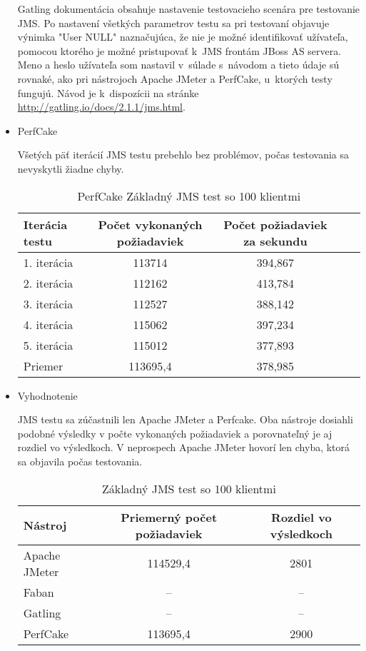 \documentclass[12pt,oneside,final]{fithesis-utf8}
\begin{document}
\begin{itemize}
Gatling dokumentácia obsahuje nastavenie testovacieho scenára pre testovanie JMS. Po nastavení všetkých parametrov testu sa pri testovaní objavuje výnimka "{}User NULL"{} naznačujúca, že nie je možné identifikovať užívateľa, pomocou ktorého je možné pristupovať k~JMS frontám JBoss AS servera. Meno a heslo užívateľa som nastavil v~súlade s~návodom a tieto údaje sú rovnaké, ako pri nástrojoch Apache JMeter a PerfCake, u~ktorých testy fungujú. Návod je k~dispozícii na stránke \url{http://gatling.io/docs/2.1.1/jms.html}.

\item PerfCake

Všetých päť iterácií JMS testu prebehlo bez problémov, počas testovania sa nevyskytli žiadne chyby.

\begin{table}[H]
\begin{center}
\begin{tabular}{ | l | c | c | c | c |}
		\hline
		 \textbf{Iterácia testu} & \textbf{Počet vykonaných požiadaviek} & \textbf{Počet požiadaviek za sekundu} \\ \hline
		 1. iterácia & 113714 & 394,867 \\ \hline
		 2. iterácia & 112162 & 413,784 \\ \hline
		 3. iterácia & 112527 & 388,142 \\ \hline
		 4. iterácia & 115062 & 397,234 \\ \hline
		 5. iterácia & 115012 & 377,893 \\ \hline
		 Priemer & 113695,4 & 378,985 \\ \hline
		 
\end{tabular}
\end{center}
\caption{PerfCake Základný JMS test so 100 klientmi}
\end{table}

\item Vyhodnotenie

JMS testu sa zúčastnili len Apache JMeter a Perfcake. Oba nástroje dosiahli podobné výsledky v počte vykonaných požiadaviek a porovnateľný je aj rozdiel vo výsledkoch. V neprospech Apache JMeter hovorí len chyba, ktorá sa objavila počas testovania.

\begin{table}[H]
\begin{center}
\begin{tabular}{ | l | c | c |}
		\hline
		 \textbf{Nástroj} & \textbf{Priemerný počet požiadaviek} & \textbf{Rozdiel vo výsledkoch} \\ \hline
		 Apache JMeter & 114529,4 & 2801 \\ \hline
		 Faban & -- & -- \\ \hline
		 Gatling & -- & -- \\ \hline
		 PerfCake & 113695,4 & 2900 \\ \hline
\end{tabular}
\end{center}
\caption{Základný JMS test so 100 klientmi}
\end{table}

\end{itemize}
\end{document}
